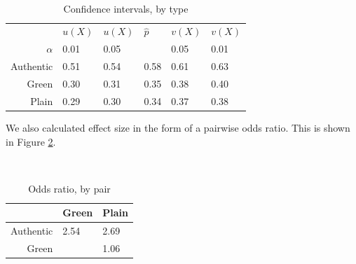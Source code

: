 \documentclass[twoside,letterpaper]{soups}
\begin{document}
\begin{table}
\centering
\caption{Confidence intervals, by type}
\mbox{}\\
\begin{tabular}{|r|l|l|l|l|l|}
\hline
            & $u(X)$    & $u(X)$    & $\hat{p}$ & $v(X)$    & $v(X)$ \\
$\alpha$    & 0.01      & 0.05      &           & 0.05      & 0.01 \\
\hline
Authentic   & 0.51      & 0.54      & 0.58      & 0.61      & 0.63 \\
\hline
Green       & 0.30      & 0.31      & 0.35      & 0.38      & 0.40 \\
\hline
Plain       & 0.29      & 0.30      & 0.34      & 0.37      & 0.38 \\
\hline
\end{tabular}
\label{fig:results:cintervals}
\end{table}

We also calculated effect size in the form of a pairwise odds ratio. This is shown in Figure \ref{fig:results:oddsratios}.

\begin{table}
\centering
\caption{Odds ratio, by pair}
\mbox{}\\
\begin{tabular}{|r|l|l|}
\hline
            & Green             & Plain \\
\hline
Authentic   & 2.54              & 2.69 \\
\hline
Green       & \cellcolor{gray}  & 1.06 \\
\hline
\end{tabular}
\label{fig:results:oddsratios}
\end{table}




\end{document}
